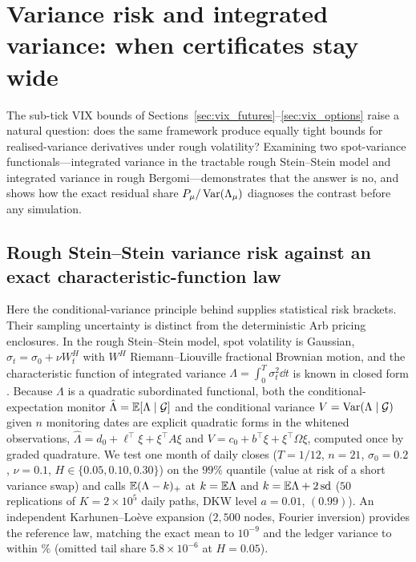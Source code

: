 \section{Variance risk and integrated variance: when certificates stay wide}\label{sec:variance_risk}

The sub-tick VIX bounds of Sections~\ref{sec:vix_futures}--\ref{sec:vix_options} raise a natural question:
does the same framework produce equally tight bounds for realised-variance derivatives under rough
volatility? Examining two spot-variance functionals---integrated variance in the tractable rough
Stein--Stein model and integrated variance in rough Bergomi---demonstrates that the answer is no, and
shows how the exact residual share $P_\mu/\operatorname{Var}(\Lambda_\mu)$ diagnoses the contrast before any simulation.

\subsection{Rough Stein--Stein variance risk against an exact characteristic-function law}\label{sec:case_steinstein}
Here the conditional-variance principle behind \RoughCertCV{} supplies statistical risk brackets. Their sampling uncertainty is distinct from the deterministic Arb pricing enclosures. In the rough Stein--Stein model, spot volatility is Gaussian, $\sigma_t=\sigma_0+\nu W_t^H$ with $W^H$
Riemann--Liouville fractional Brownian motion, and the characteristic function of integrated variance
$\Lambda=\int_0^T\sigma_t^2\dd t$ is known in closed form \citep{AbiJaber2022}. Because $\Lambda$ is a
quadratic subordinated functional, both the conditional-expectation monitor $\hat\Lambda=\mathbb{E}[\Lambda\mid\mathcal{G}]$
and the conditional variance $V=\operatorname{Var}(\Lambda\mid\mathcal{G})$ given $n$ monitoring dates are explicit
quadratic forms in the whitened observations,
$\hat\Lambda=d_0+\ell^\top\xi+\xi^\top A\xi$ and $V=c_0+b^\top\xi+\xi^\top\Omega\xi$, computed once by
graded quadrature. We test one month of daily closes ($T=1/12$, $n=21$, $\sigma_0=0.2$, $\nu=0.1$,
$H\in\{0.05,0.10,0.30\}$) on the $99\%$ quantile (value at risk of a short variance swap) and calls
$\mathbb{E}(\Lambda-k)_+$ at $k=\mathbb{E}\Lambda$ and $k=\mathbb{E}\Lambda+2\,\mathrm{sd}$ ($50$ replications of $K=2\times10^5$
daily paths, DKW level $a=0.01$, $(0.99)$). An independent Karhunen--Lo\`eve expansion
($2{,}500$ nodes, Fourier inversion) provides the reference law, matching the exact mean to $10^{-9}$ and
the ledger variance to within \EthirteenKLvar\% (omitted tail share $5.8\times10^{-6}$ at $H=0.05$).

